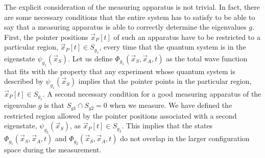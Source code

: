 \documentclass[onecolumn,nofootinbib, secnumarabic, amsmath, nobibnotes,11pt,aps,pra]{revtex4-1}
\begin{document}
The explicit consideration of the measuring apparatus is not
trivial. In fact, there are some necessary conditions that the
entire system has to satisfy to be able to say that a measuring
apparatus is able to correctly determine the eigenvalues $g$. First,
the pointer positions $\vec x_P[t]$ of such an apparatus have to be
restricted to a particular region, $\vec x_P[t]\in S_{g_1}$, every
time that the quantum system is in the eigenstate $\psi_{g_1}(\vec
x_S)$. Let us define $\Phi_{g_1}(\vec x_S,\vec x_A,t)$ as the total
wave function that fits with the property that any experiment whose
quantum system is described by $\psi_{g_1}(\vec x_S)$ implies that
the pointer points in the particular region, $\vec x_P[t]\in
S_{g_1}$. A second necessary condition for a good measuring
apparatus of the eigenvalue $g$ is that $S_{g1} \cap S_{g2} = 0$
when we measure. We have defined the restricted region
allowed by the pointer positions associated with a second
eigenstate, $\psi_{g_2}(\vec x_S)$, as $\vec x_P[t]\in S_{g_2}$.
This implies that the states $\Phi_{g_1}(\vec x_S,\vec x_A,t)$ and
$\Phi_{g_2}(\vec x_S,\vec x_A,t)$ do not overlap in the larger
configuration space during the measurement.
\end{document}
